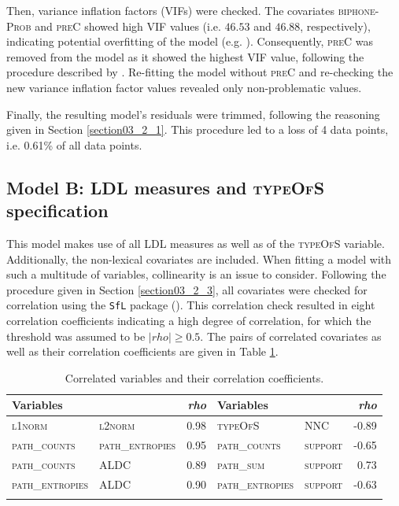 Then, variance inflation factors (VIFs) were checked. The covariates \textsc{biphone-Prob} and \textsc{preC} showed high VIF values (i.e. $46.53$ and $46.88$, respectively), indicating potential overfitting of the model (e.g. \cite{Zuur2010, Fox2019}). Consequently, \textsc{preC} was removed from the model as it showed the highest VIF value, following the procedure described by \citet{Zuur2010}. Re-fitting the model without \textsc{preC} and re-checking the new variance inflation factor values revealed only non-problematic values. 

Finally, the resulting model’s residuals were trimmed, following the reasoning given in Section \ref{section03_2_1}. This procedure led to a loss of 4 data points, i.e. 0.61\% of all data points.

\subsection{Model B: LDL measures and \textsc{typeOfS} specification}\label{section05_2_5}

This model makes use of all LDL measures as well as of the \textsc{typeOfS} variable. Additionally, the non-lexical covariates are included. When fitting a model with such a multitude of variables, collinearity is an issue to consider. Following the procedure given in Section \ref{section03_2_3}, all covariates were checked for correlation using the \texttt{SfL} package (\cite{Schmitz2021sfl}). This correlation check resulted in eight correlation coefficients indicating a high degree of correlation, for which the threshold was assumed to be $|rho|≥0.5$. The pairs of correlated covariates as well as their correlation coefficients are given in Table \ref{tab:5.4}.

\begin{table}\fontsize{10}{11}
\caption{Correlated variables and their correlation coefficients.}
\label{tab:5.4}
\centering
\begin{tabular}{llrllr} 
\lsptoprule
Variables       & ~               & \textit{rho} & Variables       & ~       & \textit{rho}  \\ 
\midrule
\textsc{l1norm}          & \textsc{l2norm}          & 0.98         & \textsc{typeOfS}         & \textsc{NNC}     & -0.89         \\
\textsc{path\_counts}    & \textsc{path\_entropies} & 0.95         & \textsc{path\_counts}    & \textsc{support} & -0.65         \\
\textsc{path\_counts}    & \textsc{ALDC}            & 0.89         & \textsc{path\_sum}       & \textsc{support} & 0.73          \\
\textsc{path\_entropies} & \textsc{ALDC}            & 0.90         & \textsc{path\_entropies} & \textsc{support} & -0.63         \\
\lspbottomrule
\end{tabular}
\end{table}

